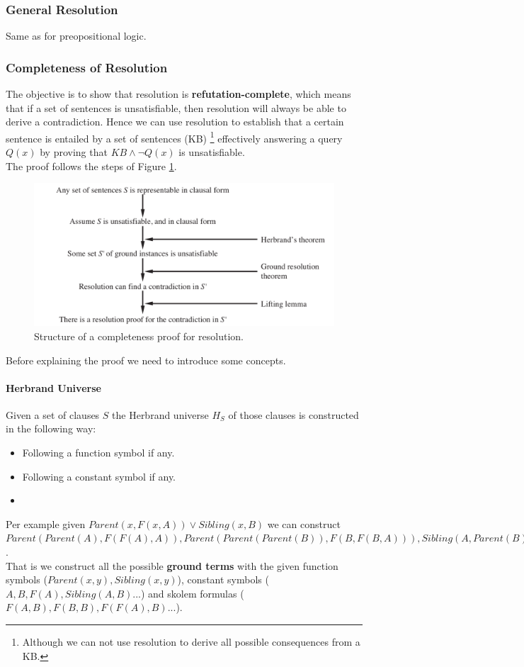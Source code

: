 \documentclass[10pt,a4paper]{article}
\begin{document}
\subsubsection{General Resolution}
Same as for preopositional logic.


\subsubsection{Completeness of Resolution}
The objective is to show that resolution is \textbf{refutation-complete}, which means that if a set of sentences is unsatisfiable, then resolution will always be able to derive a contradiction. Hence we can use resolution to establish that a certain sentence is entailed by a set of sentences (KB) \footnote{Although we can not use resolution to derive all possible consequences from a KB.} effectively answering a query $Q(x)$ by proving that $KB \wedge \neg Q(x)$ is unsatisfiable.\\
The proof follows the steps of Figure \ref{fig:fol_res_complete}.

\begin{figure}[H]
\includegraphics[scale=0.5]{images/fol_res_complete.png}
\caption{Structure of a completeness proof for resolution.}
\label{fig:fol_res_complete}
\end{figure}

Before explaining the proof we need to introduce some concepts.
\paragraph{Herbrand Universe}
Given a  set of clauses $S$ the Herbrand universe $H_S$ of those clauses is constructed in the following way:
\begin{itemize}
\item Following a function symbol if any.
\item Following a constant symbol if any.
\item 
\end{itemize}
Per example given $Parent(x,F(x,A))\vee Sibling(x,B)$ we can construct $Parent(Parent(A),F(F(A),A)),Parent(Parent(Parent(B)),F(B,F(B,A))),Sibling(A,Parent(B))....$.\\
That is we construct all the possible \textbf{ground terms} with the given function symbols ($Parent(x,y),Sibling(x,y)$), constant symbols ($A,B,F(A),Sibling(A,B)...$) and skolem formulas ($F(A,B),F(B,B),F(F(A),B)...$). 
\end{document}
